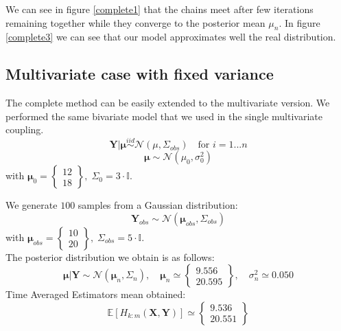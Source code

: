\documentclass[11pt,a4paper,oneside]{report}
\begin{document}
We can see in figure \ref{complete1} that the chains meet after few iterations remaining together while they converge to the posterior mean $\mu_{n}$. In figure \ref{complete3} we can see that our model approximates well the real distribution.



\subsection{Multivariate case with fixed variance}

The complete method can be easily extended to the multivariate version. We performed the same bivariate model that we used in the single multivariate coupling.
$$ \boldsymbol{Y} | \boldsymbol{\mu} \overset{iid}{\sim} \mathcal{N}(\mu, \Sigma_{obs} ) \quad \text{for } i = 1 ... n $$
$$ \boldsymbol{\mu}  \sim \mathcal{N}(\mu_0, \sigma_0^2)$$
with $\boldsymbol{\mu}_0 =
\begin{Bmatrix}    %
	12 \\
	18
\end{Bmatrix} 
, \; \Sigma_0 = 3 \cdot \mathbb{I}$.

We generate $100$ samples from a Gaussian distribution:
$$
\boldsymbol{Y}_{obs} \sim \mathcal{N}(\boldsymbol{\mu}_{obs}, \Sigma_{obs})
$$
with
$  \boldsymbol{\mu}_{obs} =
\begin{Bmatrix}  
	10 \\
	20
\end{Bmatrix}  
, \;  \Sigma_{obs}  = 5 \cdot \mathbb{I}
$.\\

The posterior distribution we obtain is as follows:
$$  \boldsymbol{\mu} | \boldsymbol{Y} \sim \mathcal{N}(\boldsymbol{\mu}_n, \Sigma_n), 
\quad \boldsymbol{\mu}_n \simeq \begin{Bmatrix}   
9.556 \\
20.595
\end{Bmatrix} ,
\quad
\sigma^2_n
\simeq 0.050  $$
Time Averaged Estimators mean obtained:
$$ \mathbb{E}[H_{k:m}(\boldsymbol{X},\boldsymbol{Y})] \simeq \begin{Bmatrix}   
9.536 \\
20.551
\end{Bmatrix}$$
\end{document}

